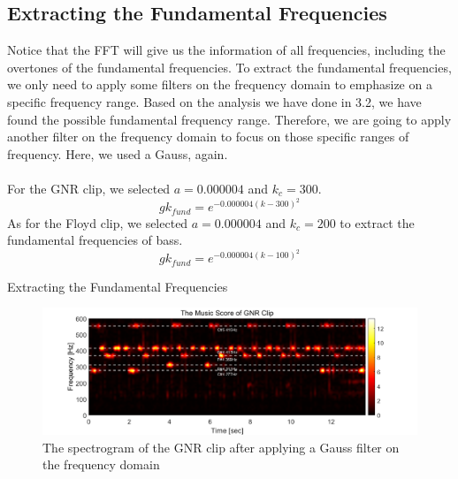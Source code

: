 \documentclass{article}
\begin{document}
\subsection{Extracting the Fundamental Frequencies}
Notice that the FFT will give us the information of all frequencies, including the overtones of the fundamental frequencies. To extract the fundamental frequencies, we only need to apply some filters on the frequency domain to emphasize on a specific frequency range. Based on the analysis we have done in 3.2, we have found the possible fundamental frequency range. Therefore, we are going to apply another filter on the frequency domain to focus on those specific ranges of frequency. Here, we used a Gauss, again. \\
~\\
For the GNR clip, we selected $a=0.000004$ and $k_c=300$. 
\begin{equation}
    gk_{fund} = e^{-0.000004(k-300)^2}
\end{equation}
As for the Floyd clip, we selected $a=0.000004$ and $k_c=200$ to extract the fundamental frequencies of bass.
\begin{equation}
    gk_{fund} = e^{-0.000004(k-100)^2}
\end{equation}
\begin{algorithm}
\begin{algorithmic}
    \ENDFOR
\end{algorithmic}
\caption{Extracting the Fundamental Frequencies}
\end{algorithm}
\begin{figure}[h]
    \centerline{\includegraphics[width=6in]{music_score_GNR.png}}
    \caption{The spectrogram of the GNR clip after applying a Gauss filter on the frequency domain}
\end{figure}\\
\end{document}
